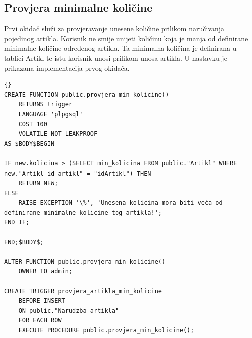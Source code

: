 \documentclass{foi}
\begin{document}
\subsection{Provjera minimalne količine}
Prvi okidač služi za provjeravanje unesene količine prilikom naručivanja pojedinog artikla. Korisnik ne smije unijeti količinu koja je manja od definirane minimalne količine određenog artikla. Ta minimalna količina je definirana u tablici Artikl te istu korisnik unosi prilikom unosa artikla. U nastavku je prikazana implementacija prvog okidača.
\lstset{commentstyle=\textit,language=python}
\begin{lstlisting}[frame=tb]{}
CREATE FUNCTION public.provjera_min_kolicine()
    RETURNS trigger
    LANGUAGE 'plpgsql'
    COST 100
    VOLATILE NOT LEAKPROOF
AS $BODY$BEGIN

IF new.kolicina > (SELECT min_kolicina FROM public."Artikl" WHERE new."Artikl_id_artikl" = "idArtikl") THEN
	RETURN NEW;
ELSE
	RAISE EXCEPTION '\%', 'Unesena kolicina mora biti veća od definirane minimalne kolicine tog artikla!';
END IF;

END;$BODY$;

ALTER FUNCTION public.provjera_min_kolicine()
    OWNER TO admin;
    
CREATE TRIGGER provjera_artikla_min_kolicine
    BEFORE INSERT
    ON public."Narudzba_artikla"
    FOR EACH ROW
    EXECUTE PROCEDURE public.provjera_min_kolicine();
\end{lstlisting}
\end{document}
